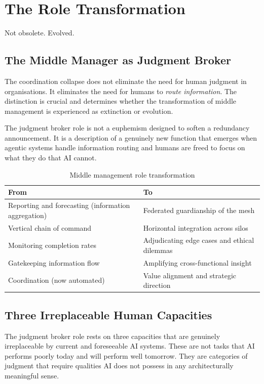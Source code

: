 \chapter{The Role Transformation}
\label{ch:role-transformation}

\epigraph{Not obsolete. Evolved.}{}

\section{The Middle Manager as Judgment Broker}

The coordination collapse does not eliminate the need for human judgment in organisations. It eliminates the need for humans to \emph{route information}. The distinction is crucial and determines whether the transformation of middle management is experienced as extinction or evolution.

The judgment broker role is not a euphemism designed to soften a redundancy announcement. It is a description of a genuinely new function that emerges when agentic systems handle information routing and humans are freed to focus on what they do that AI cannot.

\begin{table}[h]
\centering
\caption{Middle management role transformation}
\label{tab:role-transformation}
\begin{tabularx}{\textwidth}{X X}
\toprule
\textbf{From} & \textbf{To} \\
\midrule
Reporting and forecasting (information aggregation) & Federated guardianship of the mesh \\
\addlinespace
Vertical chain of command & Horizontal integration across silos \\
\addlinespace
Monitoring completion rates & Adjudicating edge cases and ethical dilemmas \\
\addlinespace
Gatekeeping information flow & Amplifying cross-functional insight \\
\addlinespace
Coordination (now automated) & Value alignment and strategic direction \\
\bottomrule
\end{tabularx}
\end{table}

\section{Three Irreplaceable Human Capacities}

The judgment broker role rests on three capacities that are genuinely irreplaceable by current and foreseeable AI systems. These are not tasks that AI performs poorly today and will perform well tomorrow. They are categories of judgment that require qualities AI does not possess in any architecturally meaningful sense.

